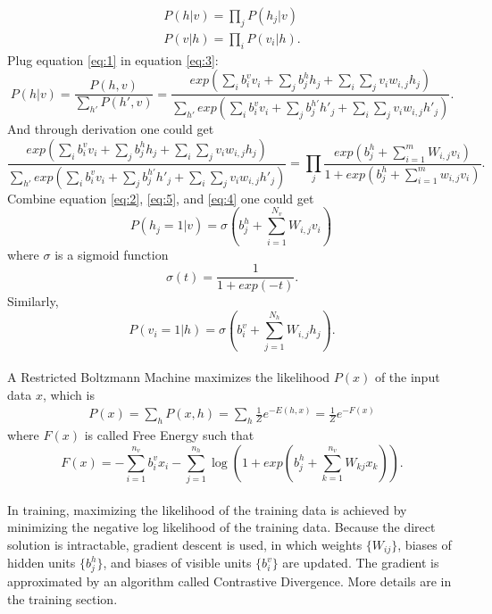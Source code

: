 \documentclass[12pt]{article}
\begin{document}
\begin{gather}
P(h|v)=\prod_j P(h_j|v) \label{eq:2}\\
P(v|h)=\prod_i P(v_i|h).
\end{gather}
Plug equation \eqref{eq:1} in equation \eqref{eq:3}: \begin{equation} \label{eq:5}
P(h|v)=\frac{P(h,v)}{\sum_{h'} P(h',v)}=\frac{exp(\sum_i b^v_i v_i + \sum_j b^h_j h_j +\sum_i \sum_j v_i w_{i,j} h_j)}{\sum_{h'} exp(\sum_i b^v_i v_i + \sum_j b^{h'}_j h'_j +\sum_i \sum_j v_i w_{i,j} h'_j)}.
\end{equation}
And through derivation one could get\begin{equation}\label{eq:4}
\frac{exp(\sum_i b^v_i v_i + \sum_j b^h_j h_j +\sum_i \sum_j v_i w_{i,j} h_j)}{\sum_{h'} exp(\sum_i b^v_i v_i + \sum_j b^{h'}_j h'_j +\sum_i \sum_j v_i w_{i,j} h'_j)}=\prod_{j}\frac{exp(b^h_j + \sum_{i=1}^m W_{i,j} v_i )}{1+exp(b^h_j + \sum_{i=1}^m w_{i,j} v_i )}.
\end{equation}
Combine equation \eqref{eq:2}, \eqref{eq:5}, and \eqref{eq:4} one could get
\begin{equation}
P(h_j=1|v) = \sigma \left(b^h_j + \sum_{i=1}^{N_v} W_{i,j} v_i \right)\,
\end{equation}
where $\sigma$ is a sigmoid function\begin{equation}
\sigma(t) = \frac{1} {1 + exp(-t)}.
\end{equation}
Similarly,
\begin{equation}
P(v_i=1|h) = \sigma \left(b^v_i + \sum_{j=1}^{N_h} W_{i,j} h_j \right).
\end{equation}
\\
A Restricted Boltzmann Machine maximizes the likelihood $P(x)$ of the input data $x$, which is\begin{align}
P(x) = \sum_h P(x,h) = \sum_h \frac{1}{Z}e^{-E(h, x)}=\frac{1}{Z}e^{-F(x)}
\end{align}
where $F(x)$ is called Free Energy such that \begin{equation}
F(x) = - \sum_{i=1}^{n_v} b^v_ix_i-\sum_{j=1}^{n_h}\log(1+ exp(b^h_j+\sum_{k=1}^{n_v} W_{kj}x_k)).
\end{equation}
\\
In training, maximizing the likelihood of the training data is achieved by minimizing the negative log likelihood of the training data. Because the direct solution is intractable, gradient descent is used, in which weights $\{W_{ij}\}$, biases of hidden units $\{b^h_j\}$, and biases of visible units $\{b^v_i\}$ are updated. The gradient is approximated by an algorithm called Contrastive Divergence. More details are in the training section.\\
\end{document}
